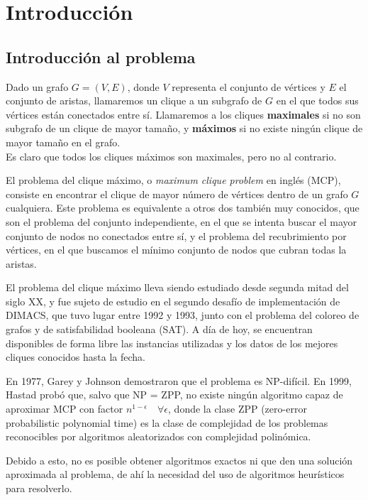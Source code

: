 \chapter{Introducción}\label{ch:introduccionMCP}

\section{Introducción al problema}

Dado un grafo $G = (V, E)$, donde $V$ representa el conjunto de vértices
y $E$ el conjunto de aristas, llamaremos un clique a un subgrafo de $G$
en el que todos sus vértices están conectados entre sí. Llamaremos a los
cliques \textbf{maximales} si no son subgrafo de un clique de mayor tamaño,
y \textbf{máximos} si no existe ningún clique de mayor tamaño en el grafo. \\
Es claro que todos los cliques máximos son maximales, pero no al contrario.

El problema del clique máximo, o \textit{maximum clique problem} en inglés (MCP),
consiste en encontrar el clique de mayor número de vértices dentro de un
grafo $G$ cualquiera. Este problema es equivalente a otros dos también muy conocidos,
que son el problema del conjunto independiente, en el que se intenta buscar el mayor
conjunto de nodos no conectados entre sí, y el problema del recubrimiento por vértices,
en el que buscamos el mínimo conjunto de nodos que cubran todas la aristas.

El problema del clique máximo lleva siendo estudiado desde segunda mitad del siglo XX, y fue sujeto
de estudio en el segundo desafío de implementación de DIMACS, que tuvo lugar entre 1992
y 1993, junto con el problema del coloreo de grafos y de satisfabilidad booleana (SAT).
A día de hoy, se encuentran disponibles de forma libre las instancias utilizadas y los
datos de los mejores cliques conocidos hasta la fecha.

En 1977, Garey y Johnson demostraron que el problema es NP-difícil. En 1999, Hastad
probó que, salvo que NP = ZPP, no existe ningún algoritmo capaz de aproximar MCP con
factor $n^{1-\epsilon} \quad \forall \epsilon$, donde la clase ZPP (zero-error
probabilistic polynomial time) es la clase de complejidad de los problemas
reconocibles por algoritmos aleatorizados con complejidad polinómica.

Debido a esto, no es posible obtener algoritmos exactos ni que den una solución
aproximada al problema, de ahí la necesidad del uso de algoritmos heurísticos para
resolverlo.


